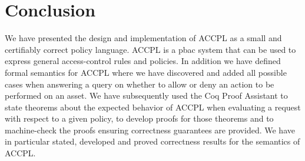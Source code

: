 \documentclass[runningheads,a4paper]{llncs}
\begin{document}
\section{Conclusion}
We have presented the design and implementation of \ac{ACCPL} as a small and certifiably correct policy language. \ac{ACCPL} is a \ac{pbac} system that can be used to express general access-control rules and policies. In addition we have defined formal semantics for \ac{ACCPL} where we have discovered and added all possible cases when answering a query on whether to allow or deny an action to be performed on an asset. We have subsequently used the Coq Proof Assistant to state theorems about the expected behavior of \ac{ACCPL} when evaluating a request with respect to a given policy, to develop proofs for those theorems and to machine-check the proofs ensuring correctness guarantees are provided. We have in particular stated, developed and proved correctness results for the semantics of \ac{ACCPL}. 







\end{document}
